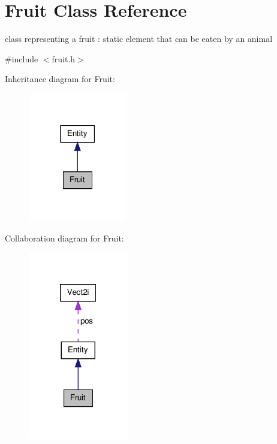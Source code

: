 \hypertarget{class_fruit}{\section{Fruit Class Reference}
\label{class_fruit}
}


class representing a fruit \-: static element that can be eaten by an animal  




{\ttfamily \#include $<$fruit.\-h$>$}



Inheritance diagram for Fruit\-:\nopagebreak
\begin{figure}[H]
\begin{center}
\leavevmode
\includegraphics[width=122pt]{class_fruit__inherit__graph}
\end{center}
\end{figure}


Collaboration diagram for Fruit\-:
\nopagebreak
\begin{figure}[H]
\begin{center}
\leavevmode
\includegraphics[width=124pt]{class_fruit__coll__graph}
\end{center}
\end{figure}
